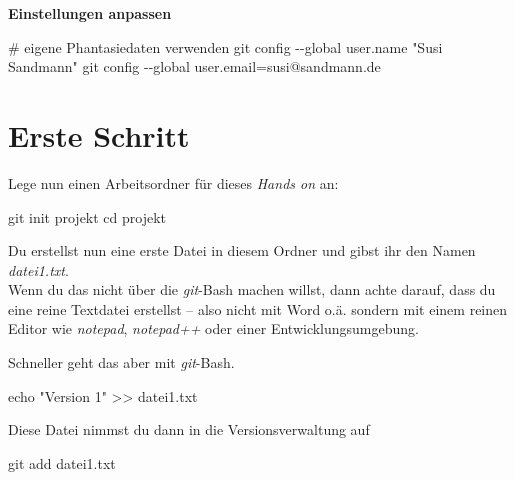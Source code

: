 \documentclass[
  letterpaper,
  DIV=11]{scrreprt}
\newenvironment{Shaded}{\begin{snugshade}}{\end{snugshade}}
\newcommand{\AttributeTok}[1]{\textcolor[rgb]{0.40,0.45,0.13}{#1}}
\newcommand{\BuiltInTok}[1]{\textcolor[rgb]{0.00,0.23,0.31}{#1}}
\newcommand{\CommentTok}[1]{\textcolor[rgb]{0.37,0.37,0.37}{#1}}
\newcommand{\FunctionTok}[1]{\textcolor[rgb]{0.28,0.35,0.67}{#1}}
\newcommand{\NormalTok}[1]{\textcolor[rgb]{0.00,0.23,0.31}{#1}}
\newcommand{\OperatorTok}[1]{\textcolor[rgb]{0.37,0.37,0.37}{#1}}
\newcommand{\StringTok}[1]{\textcolor[rgb]{0.13,0.47,0.30}{#1}}
\newcommand{\git}{\textit{git}\xspace}
\newcommand{\datei}[1]{\textit{#1}\xspace}
\begin{document}
\textbf{Einstellungen anpassen}

\begin{Shaded}
\begin{Highlighting}[]
\CommentTok{\# eigene Phantasiedaten verwenden}
\FunctionTok{git}\NormalTok{ config }\AttributeTok{{-}{-}global}\NormalTok{ user.name }\StringTok{"Susi Sandmann"} 
\FunctionTok{git}\NormalTok{ config }\AttributeTok{{-}{-}global}\NormalTok{ user.email=susi@sandmann.de}
\end{Highlighting}
\end{Shaded}

\section{Erste Schritt}\label{erste-schritt}

Lege nun einen Arbeitsordner für dieses \emph{Hands on} an:

\begin{Shaded}
\begin{Highlighting}[]
\FunctionTok{git}\NormalTok{ init projekt }
\BuiltInTok{cd}\NormalTok{ projekt }
\end{Highlighting}
\end{Shaded}

Du erstellst nun eine erste Datei in diesem Ordner und gibst ihr den
Namen \datei{datei1.txt}.\\
Wenn du das nicht über die \git-Bash machen willst, dann achte darauf,
dass du eine reine Textdatei erstellst -- also nicht mit Word o.ä.
sondern mit einem reinen Editor wie \emph{notepad}, \emph{notepad++}
oder einer Entwicklungsumgebung.

Schneller geht das aber mit \git-Bash.

\begin{Shaded}
\begin{Highlighting}[]
\BuiltInTok{echo} \StringTok{"Version 1"} \OperatorTok{\textgreater{}\textgreater{}}\NormalTok{ datei1.txt }
\end{Highlighting}
\end{Shaded}

Diese Datei nimmst du dann in die Versionsverwaltung auf

\begin{Shaded}
\begin{Highlighting}[]
\FunctionTok{git}\NormalTok{ add datei1.txt }
\end{Highlighting}
\end{Shaded}
\end{document}
